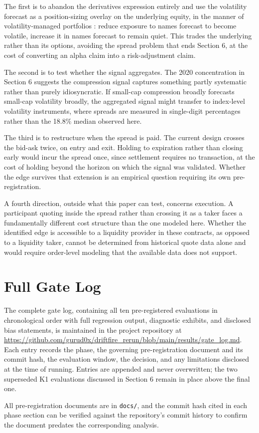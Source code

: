 \documentclass[11pt]{article}
\begin{document}
The first is to abandon the derivatives expression entirely and use the volatility forecast as a position-sizing overlay on the underlying equity, in the manner of volatility-managed portfolios \citep{moreiramuir2017}: reduce exposure to names forecast to become volatile, increase it in names forecast to remain quiet. This trades the underlying rather than its options, avoiding the spread problem that ends Section 6, at the cost of converting an alpha claim into a risk-adjustment claim.

The second is to test whether the signal aggregates. The 2020 concentration in Section 6 suggests the compression signal captures something partly systematic rather than purely idiosyncratic. If small-cap compression broadly forecasts small-cap volatility broadly, the aggregated signal might transfer to index-level volatility instruments, where spreads are measured in single-digit percentages rather than the 18.8\% median observed here.

The third is to restructure when the spread is paid. The current design crosses the bid-ask twice, on entry and exit. Holding to expiration rather than closing early would incur the spread once, since settlement requires no transaction, at the cost of holding beyond the horizon on which the signal was validated. Whether the edge survives that extension is an empirical question requiring its own pre-registration.

A fourth direction, outside what this paper can test, concerns execution. A participant quoting inside the spread rather than crossing it as a taker faces a fundamentally different cost structure than the one modeled here. Whether the identified edge is accessible to a liquidity provider in these contracts, as opposed to a liquidity taker, cannot be determined from historical quote data alone and would require order-level modeling that the available data does not support.




\appendix
\section{Full Gate Log}
The complete gate log, containing all ten pre-registered evaluations in 
chronological order with full regression output, diagnostic exhibits, 
and disclosed bias statements, is maintained in the project repository 
at \url{https://github.com/gurud0x/driftfire_rerun/blob/main/results/gate_log.md}. 
Each entry records the phase, the governing pre-registration document 
and its commit hash, the evaluation window, the decision, and any 
limitations disclosed at the time of running. Entries are appended and 
never overwritten; the two superseded K1 evaluations discussed in 
Section 6 remain in place above the final one.

All pre-registration documents are in \texttt{docs/}, and the commit 
hash cited in each phase section can be verified against the repository's 
commit history to confirm the document predates the corresponding 
analysis.
\end{document}
